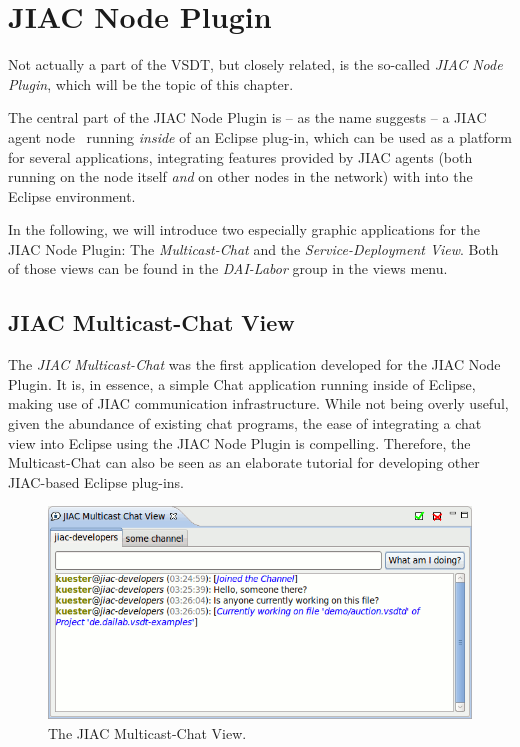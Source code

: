 \chapter{JIAC Node Plugin}
\label{sec:user_jiac-node}

Not actually a part of the VSDT, but closely related, is the so-called \emph{JIAC
Node Plugin}, which will be the topic of this chapter.

The central part of the JIAC Node Plugin is -- as the name suggests -- a JIAC
agent node~\cite{hirsch2009jiacv} running \emph{inside} of an Eclipse
plug-in, which can be used as a platform for several applications, integrating
features provided by JIAC agents (both running on the node itself \emph{and} on
other nodes in the network) with into the Eclipse environment.

In the following, we will introduce two especially graphic applications for the
JIAC Node Plugin: The \emph{Multicast-Chat} and the \emph{Service-Deployment
View}.  Both of those views can be found in the \emph{DAI-Labor} group in the
views menu.



\section{JIAC Multicast-Chat View}

The \emph{JIAC Multicast-Chat} was the first application developed for the JIAC
Node Plugin.  It is, in essence, a simple Chat application running inside of
Eclipse, making use of JIAC communication infrastructure.  While not being overly
useful, given the abundance of existing chat programs, the ease of integrating a
chat view into Eclipse using the JIAC Node Plugin is compelling.  Therefore, the
Multicast-Chat can also be seen as an elaborate tutorial for developing other
JIAC-based Eclipse plug-ins.

\begin{figure}[ht]
	\centering
	\includegraphics[width=.5\textwidth]{figures/features/multicast-chat.png}
	\caption{The JIAC Multicast-Chat View.}
	\label{fig:chatView}
\end{figure}


